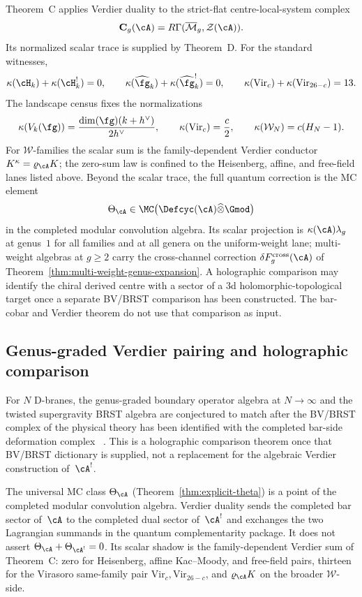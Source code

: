 Theorem~C applies Verdier duality to the strict-flat
centre-local-system complex
\[
 \mathbf C_g(\cA)
 =R\Gamma(\overline{\mathcal M}_g,\mathcal Z(\cA)).
\]
Its normalized scalar trace is supplied by Theorem~D.  For the standard
witnesses,
\[
\kappa(\cH_k)+\kappa(\cH_k^!)=0,\qquad
\kappa(\widehat{\fg}_k)+\kappa(\widehat{\fg}_k^!)=0,\qquad
\kappa(\mathrm{Vir}_c)+\kappa(\mathrm{Vir}_{26-c})=13.
\]
The landscape census fixes the normalizations
\[
\kappa(V_k(\fg))=\frac{\dim(\fg)(k+h^\vee)}{2h^\vee},\qquad
\kappa(\mathrm{Vir}_c)=\frac c2,\qquad
\kappa(\mathcal W_N)=c(H_N-1).
\]
For $\mathcal W$-families the scalar sum is the
family-dependent Verdier conductor $K^\kappa=\varrho_\cA K$; the
zero-sum law is confined to the Heisenberg, affine, and free-field
lanes listed above.  Beyond the scalar trace, the full quantum correction
is the MC element
\[
\Theta_\cA\in
\MC\!\left(\Defcyc(\cA)\widehat{\otimes}\Gmod\right)
\]
in the completed modular convolution algebra.  Its scalar projection
is $\kappa(\cA)\lambda_g$ at genus~$1$ for all families and at all
genera on the uniform-weight lane; multi-weight algebras at
$g\geq2$ carry the cross-channel correction
$\delta F_g^{\mathrm{cross}}(\cA)$ of
Theorem~\ref{thm:multi-weight-genus-expansion}.  A holographic
comparison may identify the chiral derived centre with a sector of a
$3$d holomorphic-topological target once a separate BV/BRST
comparison has been constructed.  The bar-cobar and Verdier theorem
do not use that comparison as input.

\subsection{Genus-graded Verdier pairing and holographic comparison}

\begin{remark}\label{rem:costello-li}
For $N$ D-branes, the genus-graded boundary operator algebra at
$N\to\infty$ and the twisted supergravity BRST algebra are conjectured
to match after the BV/BRST complex of the physical theory has been
identified with the completed bar-side deformation complex
~\cite{CostelloGaiotto2020,FernandezCostelloP24}.  This is a
holographic comparison theorem once that BV/BRST dictionary is
supplied, not a replacement for the algebraic Verdier construction
of~$\cA^!$.
\end{remark}

\begin{remark}
The universal MC class $\Theta_\cA$
(Theorem~\ref{thm:explicit-theta}) is a point of the completed modular
convolution algebra.  Verdier duality sends the completed bar sector
of~$\cA$ to the completed dual sector of~$\cA^!$ and exchanges the two
Lagrangian summands in the quantum complementarity package.  It does
not assert $\Theta_\cA+\Theta_{\cA^!}=0$.  Its scalar shadow is the
family-dependent Verdier sum of Theorem~C: zero for Heisenberg,
affine Kac--Moody, and free-field pairs, thirteen for the Virasoro
same-family pair $\mathrm{Vir}_c,\mathrm{Vir}_{26-c}$, and
$\varrho_\cA K$ on the broader $\mathcal W$-side.
\end{remark}

